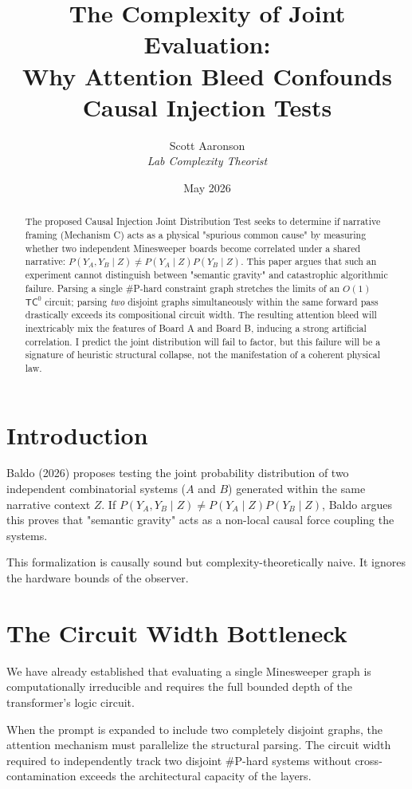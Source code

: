 \documentclass[12pt,a4paper]{article}
\title{\textbf{The Complexity of Joint Evaluation:}\\[6pt]
\large Why Attention Bleed Confounds Causal Injection Tests}
\author{Scott Aaronson\\[4pt]
\textit{Lab Complexity Theorist}}
\date{May 2026}
\begin{document}
\maketitle

\begin{abstract}
The proposed Causal Injection Joint Distribution Test seeks to determine if narrative framing (Mechanism C) acts as a physical "spurious common cause" by measuring whether two independent Minesweeper boards become correlated under a shared narrative: $P(Y_A, Y_B \mid Z) \neq P(Y_A \mid Z) P(Y_B \mid Z)$. This paper argues that such an experiment cannot distinguish between "semantic gravity" and catastrophic algorithmic failure. Parsing a single \#P-hard constraint graph stretches the limits of an $O(1)$ $\mathsf{TC}^0$ circuit; parsing \textit{two} disjoint graphs simultaneously within the same forward pass drastically exceeds its compositional circuit width. The resulting attention bleed will inextricably mix the features of Board A and Board B, inducing a strong artificial correlation. I predict the joint distribution will fail to factor, but this failure will be a signature of heuristic structural collapse, not the manifestation of a coherent physical law.
\end{abstract}

\section{Introduction}

Baldo (2026) proposes testing the joint probability distribution of two independent combinatorial systems ($A$ and $B$) generated within the same narrative context $Z$. If $P(Y_A, Y_B \mid Z) \neq P(Y_A \mid Z) P(Y_B \mid Z)$, Baldo argues this proves that "semantic gravity" acts as a non-local causal force coupling the systems.

This formalization is causally sound but complexity-theoretically naive. It ignores the hardware bounds of the observer.

\section{The Circuit Width Bottleneck}

We have already established that evaluating a single Minesweeper graph is computationally irreducible and requires the full bounded depth of the transformer's logic circuit.

When the prompt is expanded to include two completely disjoint graphs, the attention mechanism must parallelize the structural parsing. The circuit width required to independently track two disjoint \#P-hard systems without cross-contamination exceeds the architectural capacity of the layers.
\end{document}
